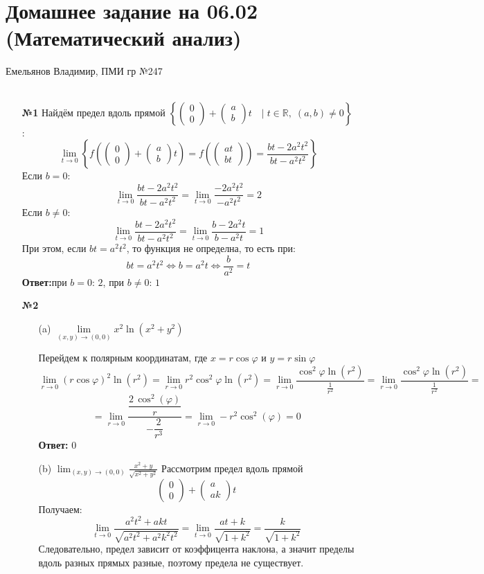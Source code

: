 \documentclass[a4paper]{article}
\newcommand{\mat}[1]{\begin{pmatrix} #1 \end{pmatrix}}
\renewcommand{\f}[2]{\frac{#1}{#2}}
\newcommand{\lm}[1]{\underset{#1}{\lim}}
\newcommand{\lr}{\Leftrightarrow}
\newcommand{\RR}{\mathbb{R}}
\begin{document}
\section*{Домашнее задание на 06.02 (Математический анализ)}
 {\large Емельянов Владимир, ПМИ гр №247}\\\\
\begin{enumerate}
    \item[\textbf{№1}]Найдём предел вдоль прямой $\left\{\mat{0\\0}+\mat{a\\b}t \quad | \;t \in \RR, \; (a, b) \neq 0\right\}$:
    $$\lim_{t \to 0}\left\{f\left(\mat{0\\0}+\mat{a\\b}t\right) = f\left(\mat{at\\bt}\right) = \f{bt-2a^2t^2}{bt-a^2t^2}\right\}$$
    Если $b=0$:
    $$\lim_{t \to 0}\f{bt-2a^2t^2}{bt-a^2t^2} = \lim_{t \to 0}\f{-2a^2t^2}{-a^2t^2} = 2$$
    Если $b \neq 0$:
    $$\lim_{t \to 0}\f{bt-2a^2t^2}{bt-a^2t^2}=\lim_{t \to 0}\f{b-2a^2t}{b-a^2t} = 1$$
    При этом, если $bt = a^2t^2$, то функция не определна, то есть при:
    $$bt = a^2t^2 \lr b = a^2t \lr \f{b}{a^2} = t$$
    \textbf{Ответ:}при $b = 0$: $2$, при $b \neq 0$: $1$\\

    \item[\textbf{№2}]\begin{enumerate}
        \item[(a)]
        $
        \lm{(x, y) \rightarrow(0,0)} x^{2} \ln \left(x^{2}+y^{2}\right)
        $

        Перейдем к полярным координатам, где $ x = r \cos \varphi $ и $ y = r \sin \varphi $     
        $$
        \lim_{r \to 0} (r \cos \varphi)^{2} \ln(r^{2}) = \lim_{r \to 0} r^{2} \cos^{2} \varphi \ln(r^{2}) = \lim_{r \to 0} \f{\cos^{2} \varphi \ln(r^{2})}{\f{1}{r^{2}}} = \lim_{r \to 0} \f{\cos^{2} \varphi \ln(r^{2})}{\f{1}{r^{2}}}=
        $$
        $$=\lim_{r \to 0} \f{\dfrac{2\,\cos^{2}\left(\varphi\right)}{r}}{-\dfrac{2}{{r}^{3}}} =\lim_{r \to 0} -{r}^{2}\cos^{2}\left(\varphi\right) = 0$$
        \textbf{Ответ:} $0$

        \item[(b)]$
        \lim _{(x, y) \rightarrow(0,0)} \frac{x^{2}+y}{\sqrt{x^{2}+y^{2}}}
        $
        Рассмотрим предел вдоль прямой $$\mat{0\\0}+\mat{a\\ak}t$$
        Получаем:
        $$
        \lim _{t \to 0} \frac{a^{2}t^2+akt}{\sqrt{a^{2}t^2+a^{2}k^2t^2}} = \lim _{t \to 0} \frac{at+k}{\sqrt{1+k^2}} = \frac{k}{\sqrt{1+k^2}} 
        $$
        Следовательно, предел зависит от коэффицента наклона, а значит пределы вдоль разных прямых разные, поэтому предела не существует.\\


\end{enumerate}
\end{enumerate}
\end{document}
